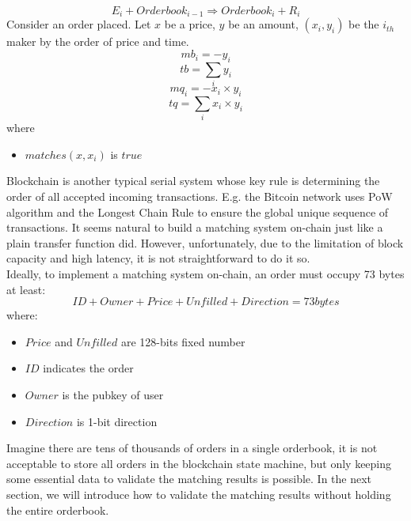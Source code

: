 \documentclass[a4paper,12pt]{article}
\begin{document}
\begin{equation*}
    E_{i} + Orderbook_{i-1} \Rightarrow Orderbook_{i} + R_{i}
\end{equation*}
Consider an order placed. Let \(x\) be a price, \(y\) be an amount,  \((x_{i}, y_{i})\) be the \(i_{th}\) maker by the order of price and time.\\
\begin{equation*}
    mb_{i}=-y_{i}
\end{equation*}
\begin{equation*}
    tb=\sum\limits_{i} y_{i}
\end{equation*}
\begin{equation*}
    mq_{i}=-x_{i} \times y_{i}
\end{equation*}
\begin{equation*}
    tq=\sum\limits_{i} x_{i} \times y_{i}
\end{equation*}
where\\
\begin{itemize}
    \item $matches(x, x_{i})$ is $true$
\end{itemize}
Blockchain is another typical serial system whose key rule is determining the order of all accepted incoming transactions. E.g. the Bitcoin network uses PoW algorithm and the Longest Chain Rule to ensure the global unique sequence of transactions. It seems natural to build a matching system on-chain just like a plain transfer function did. However, unfortunately, due to the limitation of block capacity and high latency, it is not straightforward to do it so.\\
Ideally, to implement a matching system on-chain, an order must occupy 73 bytes at least:\\
\begin{equation*}
ID + Owner + Price + Unfilled + Direction = 73 bytes
\end{equation*}
where:\\
\begin{itemize}
    \item $Price$ and $Unfilled$ are 128-bits fixed number
    \item $ID$ indicates the order
    \item $Owner$ is the pubkey of user
    \item $Direction$ is 1-bit direction
\end{itemize}
Imagine there are tens of thousands of orders in a single orderbook, it is not acceptable to store all orders in the blockchain state machine, but only keeping some essential data to validate the matching results is possible. In the next section, we will introduce how to validate the matching results without holding the entire orderbook.\\
\end{document}
